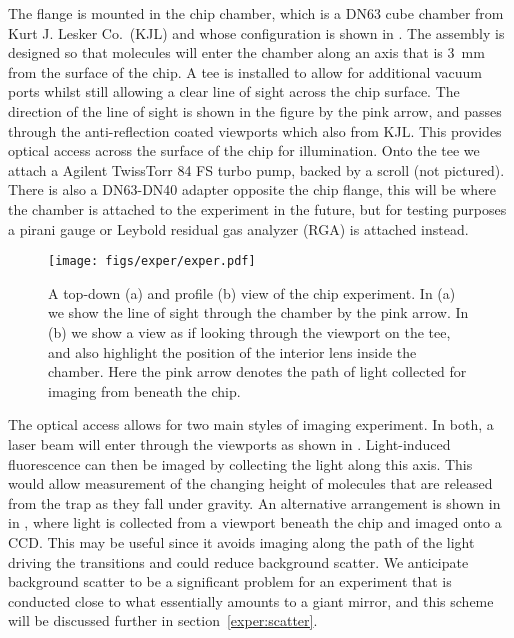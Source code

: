 The flange is mounted in the chip chamber, which is a DN63 cube chamber from
Kurt J.  Lesker Co.\ (KJL) and whose configuration is shown in
.  The assembly is designed so that molecules will
enter the chamber along an axis that is \SI{3}{\milli\meter} from the surface
of the chip. A tee is installed to allow for additional vacuum ports whilst
still allowing a clear line of sight across the chip surface. The direction of
the line of sight is shown in the figure by the pink arrow, and passes through
the anti-reflection coated viewports which also from KJL. This provides optical
access across the surface of the chip for illumination.  Onto the tee we attach
a Agilent TwissTorr 84 FS turbo pump, backed by a scroll (not pictured).  There
is also a DN63-DN40 adapter opposite the chip flange, this will be where the
chamber is attached to the \CaF{} experiment in the future, but for testing
purposes a pirani gauge or Leybold residual gas analyzer (RGA) is attached
instead.

\begin{figure}
  \centering
  \texttt{[image: figs/exper/exper.pdf]}
  \caption{A top-down (a) and profile (b) view of the chip experiment. In (a)
  we show the line of sight through the chamber by the pink arrow. In (b) we
  show a view as if looking through the viewport on the tee, and also highlight
  the position of the interior lens inside the chamber. Here the
  pink arrow denotes the path of light collected for imaging from beneath the
  chip.}
  \label{exper:fig:exper}
\end{figure}

The optical access allows for two main styles of imaging experiment. In both, a
laser beam will enter through the viewports as shown in
. Light-induced fluorescence can then be imaged
by collecting the light along this axis. This would allow measurement of the
changing height of molecules that are released from the trap as they fall under
gravity. 
%
An alternative arrangement is shown in in ,
where light is collected from a viewport beneath the chip and imaged onto a
CCD. This may be useful since it avoids imaging along the path of the light
driving the transitions and could reduce background scatter. We anticipate
background scatter to be a significant problem for an experiment that is
conducted close to what essentially amounts to a giant mirror, and this scheme
will be discussed further in section~\ref{exper:scatter}.

